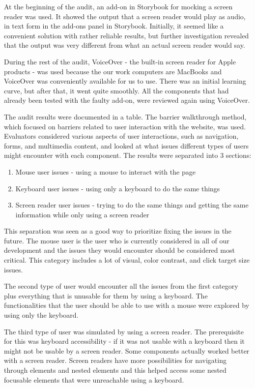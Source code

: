 \documentclass{master_thesis}
\begin{document}
At the beginning of the audit, an add-on in Storybook for mocking a screen reader \citep{Lara} was used. It showed the output that a screen reader would play as audio, in text form in the add-ons panel in Storybook. Initially, it seemed like a convenient solution with rather reliable results, but further investigation revealed that the output was very different from what an actual screen reader would say.

During the rest of the audit, VoiceOver - the built-in screen reader for Apple products - was used because the our work computers are MacBooks and VoiceOver was conveniently available for us to use. There was an initial learning curve, but after that, it went quite smoothly. All the components that had already been tested with the faulty add-on, were reviewed again using VoiceOver.

The audit results were documented in a table. The barrier walkthrough method, which focused on barriers related to user interaction with the website, was used. Evaluators considered various aspects of user interactions, such as navigation, forms, and multimedia content, and looked at what issues different types of users might encounter with each component. The results were separated into 3 sections:

\begin{enumerate}
	\item Mouse user issues - using a mouse to interact with the page
	\item Keyboard user issues - using only a keyboard to do the same things
	\item Screen reader user issues - trying to do the same things and getting the same information while only using a screen reader
\end{enumerate}

This separation was seen as a good way to prioritize fixing the issues in the future. The mouse user is the user who is currently considered in all of our development and the issues they would encounter should be considered most critical. This category includes a lot of visual, color contrast, and click target size issues.

The second type of user would encounter all the issues from the first category plus everything that is unusable for them by using a keyboard. The functionalities that the user should be able to use with a mouse were explored by using only the keyboard.

The third type of user was simulated by using a screen reader. The prerequisite for this was keyboard accessibility - if it was not usable with a keyboard then it might not be usable by a screen reader. Some components actually worked better with a screen reader. Screen readers have more possibilities for navigating through elements and nested elements and this helped access some nested focusable elements that were unreachable using a keyboard.
\end{document}
